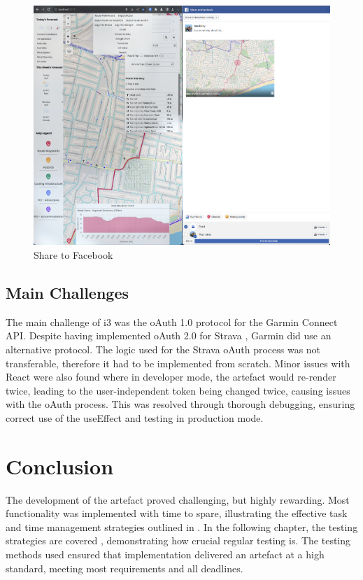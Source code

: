 \begin{figure}[!ht]
  \includegraphics[width=425px]{figures/Progress Images/Iteration-3/SR51/SR51-Share to Facebook.png}
  \centering
  \caption{Share to Facebook}
  \label{fig:facebook-share}
\end{figure}

\subsection{Main Challenges}
\label{iteration3:main-challenges}

The main challenge of i3 was the oAuth 1.0 protocol for the Garmin Connect API. Despite having implemented oAuth 2.0 for Strava , Garmin did use an alternative protocol. The logic used for the Strava oAuth process was not transferable, therefore it had to be implemented from scratch. Minor issues with React were also found where in developer mode, the artefact would re-render twice, leading to the user-independent token being changed twice, causing issues with the oAuth process. This was resolved through thorough debugging, ensuring correct use of the useEffect and testing in production mode.

\section{Conclusion}
\label{implementation:conclusion}

The development of the artefact proved challenging, but highly rewarding. Most functionality was implemented with time to spare, illustrating the effective task and time management strategies outlined in . In the following chapter, the testing strategies are covered , demonstrating how crucial regular testing is. The testing methods used ensured that implementation delivered an artefact at a high standard, meeting most requirements and all deadlines.